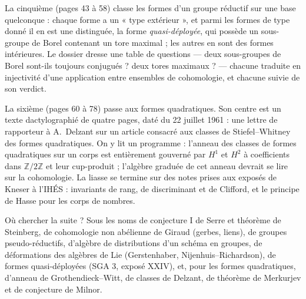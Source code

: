 \documentclass[11pt,a4paper]{article}
\begin{document}
\begin{resume}
La cinquième (pages 43 à 58) classe les formes d'un groupe réductif sur une
base quelconque : chaque forme a un « type extérieur », et parmi les formes de
type donné il en est une distinguée, la forme \emph{quasi-déployée}, qui
possède un sous-groupe de Borel contenant un tore maximal ; les autres en sont
des formes intérieures. Le dossier dresse une table de questions — deux
sous-groupes de Borel sont-ils toujours conjugués ? deux tores maximaux ? —
chacune traduite en injectivité d'une application entre ensembles de
cohomologie, et chacune suivie de son verdict.

La sixième (pages 60 à 78) passe aux formes quadratiques. Son centre est un
texte dactylographié de quatre pages, daté du 22 juillet 1961 : une lettre de
rapporteur à A.~Delzant sur un article consacré aux classes de
Stiefel--Whitney des formes quadratiques. On y lit un programme : l'anneau des
classes de formes quadratiques sur un corps est entièrement gouverné par
$H^1$ et $H^2$ à coefficients dans $\mathbb{Z}/2\mathbb{Z}$ et leur cup-produit ;
l'algèbre graduée de cet anneau devrait se lire sur la cohomologie. La
liasse se termine sur des notes prises aux exposés de Kneser à l'IHÉS :
invariants de rang, de discriminant et de Clifford, et le principe de Hasse
pour les corps de nombres.

Où chercher la suite ? Sous les noms de conjecture I de Serre et théorème de
Steinberg, de cohomologie non abélienne de Giraud (gerbes, liens), de groupes
pseudo-réductifs, d'algèbre de distributions d'un schéma en groupes, de
déformations des algèbres de Lie (Gerstenhaber, Nijenhuis--Richardson), de
formes quasi-déployées (SGA 3, exposé XXIV), et, pour les formes
quadratiques, d'anneau de Grothendieck--Witt, de classes de Delzant, de
théorème de Merkurjev et de conjecture de Milnor.

\end{resume}
\end{document}
